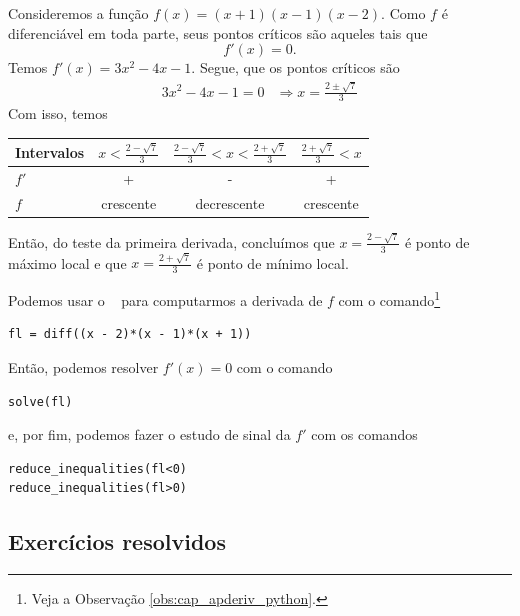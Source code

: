 \begin{ex}
  Consideremos a função $f(x)=(x+1)(x-1)(x-2)$. Como $f$ é diferenciável em toda parte, seus pontos críticos são aqueles tais que
  \begin{equation}
    f'(x)=0.
  \end{equation}
  Temos $f'(x) = 3x^2-4x-1$. Segue, que os pontos críticos são
  \begin{align}
    3x^2-4x-1=0 &\Rightarrow x = \frac{2\pm \sqrt{7}}{3}
  \end{align}
  Com isso, temos
  
  \begin{tabular}{lccc}\hline
    Intervalos & $x<\frac{2-\sqrt{7}}{3}$ & $\frac{2-\sqrt{7}}{3}<x<\frac{2+\sqrt{7}}{3}$ & $\frac{2+\sqrt{7}}{3}<x$ \\\hline
    $f'$ & + & - & + \\
    $f$ & crescente & decrescente & crescente\\\hline
  \end{tabular}

  Então, do teste da primeira derivada, concluímos que $x=\frac{2-\sqrt{7}}{3}$ é ponto de máximo local e que $x=\frac{2+\sqrt{7}}{3}$ é ponto de mínimo local.

  \ifispython
  Podemos usar o \sympy~ para computarmos a derivada de $f$ com o comando\footnote{Veja a Observação \ref{obs:cap_apderiv_python}.}
\begin{verbatim}
fl = diff((x - 2)*(x - 1)*(x + 1))
\end{verbatim}
  Então, podemos resolver $f'(x)=0$ com o comando
\begin{verbatim}
solve(fl)
\end{verbatim}
  e, por fim, podemos fazer o estudo de sinal da $f'$ com os comandos
\begin{verbatim}
reduce_inequalities(fl<0)
reduce_inequalities(fl>0)
\end{verbatim}
  \fi
\end{ex}

\subsection*{Exercícios resolvidos}

